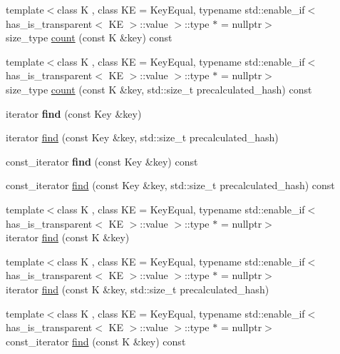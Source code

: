 \begin{DoxyCompactItemize}
\item 
{\footnotesize template$<$class K , class KE  = Key\+Equal, typename std\+::enable\+\_\+if$<$ has\+\_\+is\+\_\+transparent$<$ K\+E $>$\+::value $>$\+::type $\ast$  = nullptr$>$ }\\size\+\_\+type \mbox{\hyperlink{classtsl_1_1ordered__set_a766cac50caed1afe6b1dbb2c6447a55b}{count}} (const K \&key) const
\item 
{\footnotesize template$<$class K , class KE  = Key\+Equal, typename std\+::enable\+\_\+if$<$ has\+\_\+is\+\_\+transparent$<$ K\+E $>$\+::value $>$\+::type $\ast$  = nullptr$>$ }\\size\+\_\+type \mbox{\hyperlink{classtsl_1_1ordered__set_aced79117d7534ed3ab2d6a237a0058bc}{count}} (const K \&key, std\+::size\+\_\+t precalculated\+\_\+hash) const
\item 
\mbox{\label{classtsl_1_1ordered__set_aaa1bbc404cc363153b6eb7d505448427}} 
iterator {\bfseries find} (const Key \&key)
\item 
iterator \mbox{\hyperlink{classtsl_1_1ordered__set_abe63aacec0b31672f70753f20c7e0d8b}{find}} (const Key \&key, std\+::size\+\_\+t precalculated\+\_\+hash)
\item 
\mbox{\label{classtsl_1_1ordered__set_ab49dd84b051493b6847f5ef7c7083d2b}} 
const\+\_\+iterator {\bfseries find} (const Key \&key) const
\item 
const\+\_\+iterator \mbox{\hyperlink{classtsl_1_1ordered__set_aaef6331a007f7a8848b5dabc89238946}{find}} (const Key \&key, std\+::size\+\_\+t precalculated\+\_\+hash) const
\item 
{\footnotesize template$<$class K , class KE  = Key\+Equal, typename std\+::enable\+\_\+if$<$ has\+\_\+is\+\_\+transparent$<$ K\+E $>$\+::value $>$\+::type $\ast$  = nullptr$>$ }\\iterator \mbox{\hyperlink{classtsl_1_1ordered__set_a46c6728c8839d9bfcec8785a3a918d33}{find}} (const K \&key)
\item 
{\footnotesize template$<$class K , class KE  = Key\+Equal, typename std\+::enable\+\_\+if$<$ has\+\_\+is\+\_\+transparent$<$ K\+E $>$\+::value $>$\+::type $\ast$  = nullptr$>$ }\\iterator \mbox{\hyperlink{classtsl_1_1ordered__set_aced9be09be40ecc1b2b53148fdbeae3c}{find}} (const K \&key, std\+::size\+\_\+t precalculated\+\_\+hash)
\item 
{\footnotesize template$<$class K , class KE  = Key\+Equal, typename std\+::enable\+\_\+if$<$ has\+\_\+is\+\_\+transparent$<$ K\+E $>$\+::value $>$\+::type $\ast$  = nullptr$>$ }\\const\+\_\+iterator \mbox{\hyperlink{classtsl_1_1ordered__set_a32f4eb260419db865a600bb927fde308}{find}} (const K \&key) const

\end{DoxyCompactItemize}
